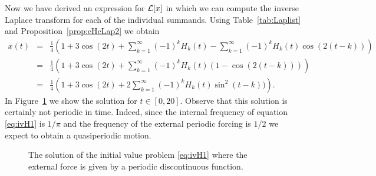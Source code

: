 \documentclass{ximera}
\begin{document}
Now we have derived an expression for ${\cal L}[x]$ in which we can compute the
inverse Laplace transform for each of the individual summands.  Using 
Table~\ref{tab:Laplist} and Proposition~\ref{prop:eHcLap2} we obtain
\begin{eqnarray*}
x(t)&=&\frac{1}{4}\left(1+3\cos(2t)+\sum_{k=1}^\infty (-1)^k H_k(t)
       -\sum_{k=1}^\infty (-1)^k H_k(t)\cos(2(t-k))\right)\\
&=&\frac{1}{4}\left(1+3\cos(2t)+\sum_{k=1}^\infty (-1)^k H_k(t)(1-\cos(2(t-k)))\right)\\
&=&\frac{1}{4}\left(1+3\cos(2t)+2\sum_{k=1}^\infty (-1)^k H_k(t)\sin^2(t-k))\right).
\end{eqnarray*}
In Figure~\ref{fig:lapperi} we show the solution for $t\in [0,20]$.  Observe 
that this solution is certainly not periodic in time.  Indeed, since the 
internal frequency of equation \eqref{eq:ivH1} is 
$1/\pi$ and the frequency of the external periodic forcing is $1/2$ we expect 
to obtain a quasiperiodic motion.
\begin{figure}[htb]
           \centerline{%
           }
           \caption{The solution of the initial value problem
	   \protect\eqref{eq:ivH1} where the external force is
   	   given by a periodic discontinuous function.}
           \label{fig:lapperi}
\end{figure}
\end{document}
